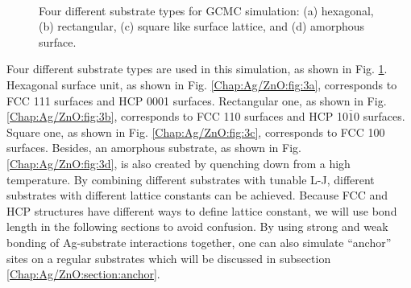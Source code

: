 \begingroup
\begin{figure}[!ht]
  \centering
  \label{Chap:Ag/ZnO:fig:3a}
  \label{Chap:Ag/ZnO:fig:3b}
  \\
  \label{Chap:Ag/ZnO:fig:3c}
  \label{Chap:Ag/ZnO:fig:3d}
\caption[Four different substrate types for GCMC simulation.]{Four different substrate types for GCMC simulation: (a) hexagonal, (b) rectangular, (c) square like surface lattice, and (d) amorphous surface. }
  \label{Chap:Ag/ZnO:fig3}
\end{figure}
\endgroup

Four different substrate types are used in this simulation, as shown in Fig. \ref{Chap:Ag/ZnO:fig3}. Hexagonal surface unit, as shown in Fig. \ref{Chap:Ag/ZnO:fig:3a}, corresponds to \ac{FCC} {111} surfaces and \ac{HCP} {0001} surfaces. Rectangular one, as shown in Fig. \ref{Chap:Ag/ZnO:fig:3b}, corresponds to \ac{FCC} {110} surfaces and \ac{HCP} {10$\overline{1}$0} surfaces. Square one, as shown in Fig. \ref{Chap:Ag/ZnO:fig:3c}, corresponds to \ac{FCC} {100} surfaces. Besides, an amorphous substrate, as shown in Fig. \ref{Chap:Ag/ZnO:fig:3d}, is also created by quenching down from a high temperature. By combining different substrates with tunable \ac{L-J}, different substrates with different lattice constants can be achieved. Because \ac{FCC} and \ac{HCP} structures have different ways to define lattice constant, we will use bond length in the following sections to avoid confusion. By using strong and weak bonding of Ag-substrate interactions together, one can also simulate ``anchor'' sites on a regular substrates which will be discussed in subsection \ref{Chap:Ag/ZnO:section:anchor}.